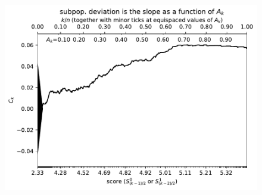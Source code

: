 \documentclass{article}
\newlength{\vertsep}
\newlength{\imsize}
\begin{document}
\begin{figure}
\begin{centering}

\parbox{\imsize}{\includegraphics[width=\imsize]
{../codes/weighted/County_of_San_Francisco_vs_San_Joaquin-LNGI/cumulative.pdf}}

\vspace{\vertsep}


\end{centering}
\end{figure}
\end{document}
